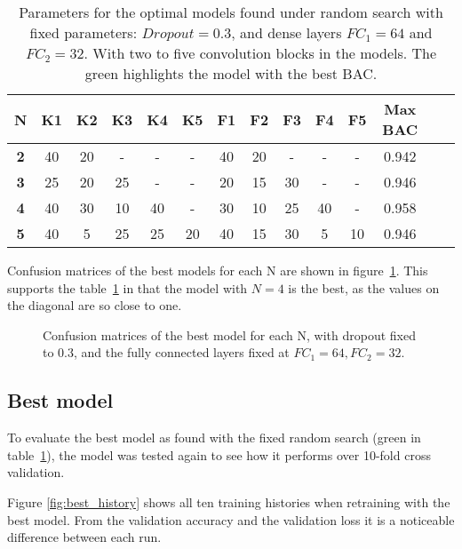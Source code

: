 \begin{table}[H]
    \centering
    \begin{tabular}{|c|c|c|c|c|c|c|c|c|c|c|c|c|c|}
        \hline
        \textbf{N} & \textbf{K1} & \textbf{K2} & \textbf{K3} & \textbf{K4} & \textbf{K5} & \textbf{F1} & \textbf{F2} & \textbf{F3} & \textbf{F4} & \textbf{F5} & \textbf{Max BAC} \\
        \hline
        \textbf{2} & 40 & 20 & - & - & - & 40 & 20 & - & - & - & 0.942   \\
        \textbf{3} & 25 & 20 & 25 & - & - & 20 & 15 & 30 & - & - & 0.946   \\
        \rowcolor{green}\textbf{4} & 40 & 30 & 10 & 40 & - & 30 & 10 & 25 & 40 & - & 0.958   \\
        \textbf{5} & 40 & 5 & 25 & 25 & 20 & 40 & 15  & 30 & 5 & 10 & 0.946   \\
        \hline
    \end{tabular}
    \caption{Parameters for the optimal models found under random search with fixed parameters: $Dropout=0.3$, and dense layers $FC_1=64$ and $FC_2=32$. With two to five convolution blocks in the models. The green highlights the model with the best BAC.}
    \label{tab:opt_parameters2}
\end{table}

Confusion matrices of the best models for each N are shown in figure~\ref{fig:confus_fix}. This supports the table~\ref{tab:opt_parameters2} in that the model with $N=4$ is the best, as the values on the diagonal are so close to one.

\begin{figure}[H]
    \centering
    
    \captionsetup{width=0.85\linewidth}
    \caption{Confusion matrices of the best model for each N, with dropout fixed to 0.3, and the fully connected layers fixed at $FC_1 = 64, FC_2 = 32$.}
    \label{fig:confus_fix}
\end{figure}


\subsection{Best model}

To evaluate the best model as found with the fixed random search (green in table~\ref{tab:opt_parameters2}), the model was tested again to see how it performs over 10-fold cross validation.

Figure \ref{fig:best_history} shows all ten training histories when retraining with the best model. From the validation accuracy and the validation loss it is a noticeable difference between each run. 

